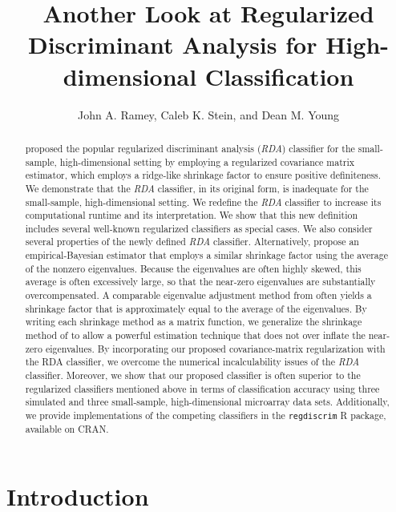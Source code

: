 \documentclass[11pt]{article}
\title{Another Look at Regularized Discriminant Analysis for High-dimensional Classification}
\author{John A. Ramey, Caleb K. Stein, and Dean M. Young}
\begin{document}
\newtheorem*{thm}{Theorem}
\newtheorem*{cor}{Corollary}


\doublespacing

\maketitle



\begin{abstract}
\cite{Friedman:1989tm} proposed the popular regularized discriminant analysis (\emph{RDA}) classifier for the small-sample, high-dimensional setting by employing a regularized covariance matrix estimator, which employs a ridge-like shrinkage factor to ensure positive definiteness. We demonstrate that the \emph{RDA} classifier, in its original form, is inadequate for the small-sample, high-dimensional setting. We redefine the \emph{RDA} classifier to increase its computational runtime and its interpretation. We show that this new definition includes several well-known regularized classifiers as special cases. We also consider several properties of the newly defined \emph{RDA} classifier. Alternatively, \cite{Srivastava:2007ww} propose an empirical-Bayesian estimator that employs a similar shrinkage factor using the average of the nonzero eigenvalues.  Because the eigenvalues are often highly skewed, this average is often excessively large, so that the near-zero eigenvalues are substantially overcompensated. A comparable eigenvalue adjustment method from \cite{Thomaz:2006ef} often yields a shrinkage factor that is approximately equal to the average of the eigenvalues. By writing each shrinkage method as a matrix function, we generalize the shrinkage method of \cite{Thomaz:2006ef} to allow a powerful estimation technique that does not over inflate the near-zero eigenvalues. By incorporating our proposed covariance-matrix regularization with the RDA classifier, we overcome the numerical incalculability issues of the \emph{RDA} classifier. Moreover, we show that our proposed classifier is often superior to the regularized classifiers mentioned above in terms of classification accuracy using three simulated and three small-sample, high-dimensional microarray data sets. Additionally, we provide implementations of the competing classifiers in the {\tt regdiscrim} R package, available on CRAN.
\end{abstract}

\section{Introduction}
\end{document}
